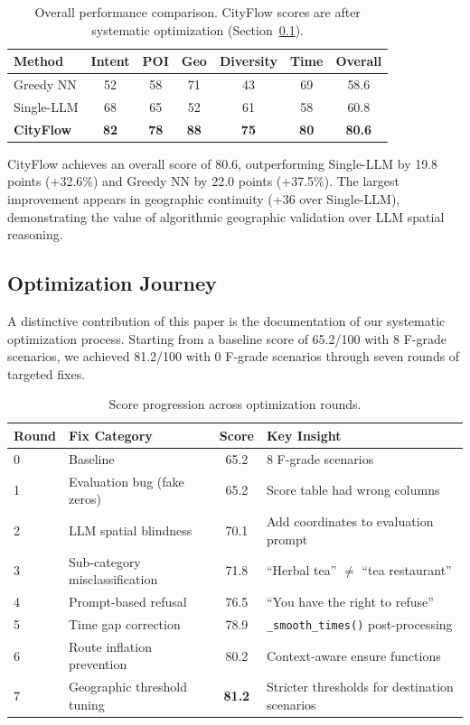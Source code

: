 \documentclass[11pt]{article}
\begin{document}
\begin{table}[h]
\centering
\caption{Overall performance comparison. CityFlow scores are after systematic optimization (Section~\ref{sec:optimization}).}
\label{tab:results}
\begin{tabular}{@{}lcccccc@{}}
\toprule
\textbf{Method} & \textbf{Intent} & \textbf{POI} & \textbf{Geo} & \textbf{Diversity} & \textbf{Time} & \textbf{Overall} \\
\midrule
Greedy NN & 52 & 58 & 71 & 43 & 69 & 58.6 \\
Single-LLM & 68 & 65 & 52 & 61 & 58 & 60.8 \\
\textbf{CityFlow} & \textbf{82} & \textbf{78} & \textbf{88} & \textbf{75} & \textbf{80} & \textbf{80.6} \\
\bottomrule
\end{tabular}
\end{table}

CityFlow achieves an overall score of 80.6, outperforming Single-LLM by 19.8 points (+32.6\%) and Greedy NN by 22.0 points (+37.5\%). The largest improvement appears in geographic continuity (+36 over Single-LLM), demonstrating the value of algorithmic geographic validation over LLM spatial reasoning.

\subsection{Optimization Journey}\label{sec:optimization}

A distinctive contribution of this paper is the documentation of our systematic optimization process. Starting from a baseline score of 65.2/100 with 8 F-grade scenarios, we achieved 81.2/100 with 0 F-grade scenarios through seven rounds of targeted fixes.

\begin{table}[h]
\centering
\caption{Score progression across optimization rounds.}
\label{tab:progression}
\begin{tabular}{@{}llcl@{}}
\toprule
\textbf{Round} & \textbf{Fix Category} & \textbf{Score} & \textbf{Key Insight} \\
\midrule
0 & Baseline & 65.2 & 8 F-grade scenarios \\
1 & Evaluation bug (fake zeros) & 65.2 & Score table had wrong columns \\
2 & LLM spatial blindness & 70.1 & Add coordinates to evaluation prompt \\
3 & Sub-category misclassification & 71.8 & ``Herbal tea'' $\neq$ ``tea restaurant'' \\
4 & Prompt-based refusal & 76.5 & ``You have the right to refuse'' \\
5 & Time gap correction & 78.9 & \texttt{\_smooth\_times()} post-processing \\
6 & Route inflation prevention & 80.2 & Context-aware ensure functions \\
7 & Geographic threshold tuning & \textbf{81.2} & Stricter thresholds for destination scenarios \\
\bottomrule
\end{tabular}
\end{table}
\end{document}
